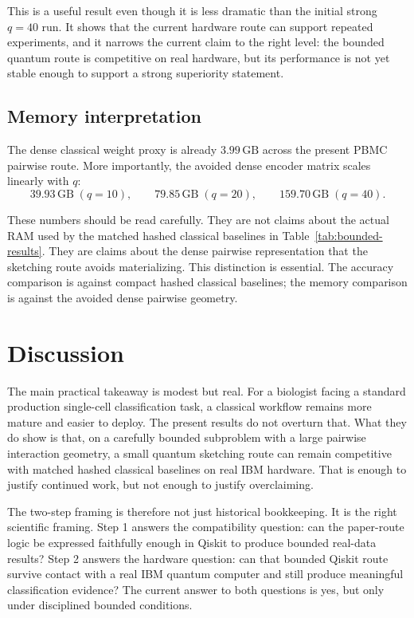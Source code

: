 \documentclass[11pt]{article}
\begin{document}
This is a useful result even though it is less dramatic than the initial strong $q=40$ run. It shows that the current hardware route can support repeated experiments, and it narrows the current claim to the right level: the bounded quantum route is competitive on real hardware, but its performance is not yet stable enough to support a strong superiority statement.

\subsection{Memory interpretation}

The dense classical weight proxy is already $3.99\,\mathrm{GB}$ across the present PBMC pairwise route. More importantly, the avoided dense encoder matrix scales linearly with $q$:
\begin{equation}
39.93\,\mathrm{GB} \; (q=10), \qquad
79.85\,\mathrm{GB} \; (q=20), \qquad
159.70\,\mathrm{GB} \; (q=40).
\end{equation}

These numbers should be read carefully. They are not claims about the actual RAM used by the matched hashed classical baselines in Table~\ref{tab:bounded-results}. They are claims about the dense pairwise representation that the sketching route avoids materializing. This distinction is essential. The accuracy comparison is against compact hashed classical baselines; the memory comparison is against the avoided dense pairwise geometry.

\section{Discussion}

The main practical takeaway is modest but real. For a biologist facing a standard production single-cell classification task, a classical workflow remains more mature and easier to deploy. The present results do not overturn that. What they do show is that, on a carefully bounded subproblem with a large pairwise interaction geometry, a small quantum sketching route can remain competitive with matched hashed classical baselines on real IBM hardware. That is enough to justify continued work, but not enough to justify overclaiming.

The two-step framing is therefore not just historical bookkeeping. It is the right scientific framing. Step 1 answers the compatibility question: can the paper-route logic be expressed faithfully enough in Qiskit to produce bounded real-data results? Step 2 answers the hardware question: can that bounded Qiskit route survive contact with a real IBM quantum computer and still produce meaningful classification evidence? The current answer to both questions is yes, but only under disciplined bounded conditions.
\end{document}
